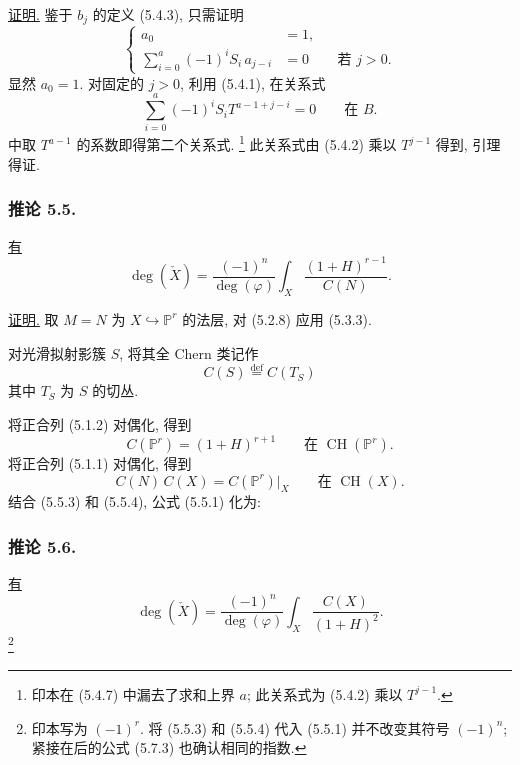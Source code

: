 \noindent\underline{证明.}
鉴于 $b_j$ 的定义 (5.4.3), 只需证明
\begin{equation}\tag{5.4.6}
\left\{
\begin{aligned}
a_0&=1,\\
\sum_{i=0}^{a}(-1)^iS_i\,a_{j-i}&=0
&&\text{若 }j>0.
\end{aligned}
\right.
\end{equation}
显然 $a_0=1$. 对固定的 $j>0$, 利用 (5.4.1), 在关系式
\begin{equation}\tag{5.4.7}
\sum_{i=0}^{a}(-1)^iS_iT^{a-1+j-i}=0
\qquad\text{在 }B.
\end{equation}
中取 $T^{a-1}$ 的系数即得第二个关系式.
\footnote{印本在 (5.4.7) 中漏去了求和上界 $a$; 此关系式为 (5.4.2) 乘以 $T^{j-1}$.}
此关系式由 (5.4.2) 乘以 $T^{j-1}$ 得到, 引理得证.

\subsubsection*{推论 5.5.}
\underline{有}
\begin{equation}\tag{5.5.1}
\deg(\check X)
=\frac{(-1)^n}{\deg(\varphi)}
\int_X\frac{(1+H)^{r-1}}{C(N)}.
\end{equation}

\noindent\underline{证明.}
取 $M=N$ 为 $X\hookrightarrow\mathbb P^r$ 的法层, 对 (5.2.8) 应用 (5.3.3).

对光滑拟射影簇 $S$, 将其全 Chern 类记作
\begin{equation}\tag{5.5.2}
C(S)\stackrel{\mathrm{def}}{=}C(T_S)
\end{equation}
其中 $T_S$ 为 $S$ 的切丛.

将正合列 (5.1.2) 对偶化, 得到
\begin{equation}\tag{5.5.3}
C(\mathbb P^r)=(1+H)^{r+1}
\qquad\text{在 }\operatorname{CH}(\mathbb P^r).
\end{equation}
将正合列 (5.1.1) 对偶化, 得到
\begin{equation}\tag{5.5.4}
C(N)\,C(X)=C(\mathbb P^r)|_X
\qquad\text{在 }\operatorname{CH}(X).
\end{equation}
结合 (5.5.3) 和 (5.5.4), 公式 (5.5.1) 化为:

\subsubsection*{推论 5.6.}
\underline{有}
\begin{equation}\tag{5.6.1}
\deg(\check X)
=\frac{(-1)^n}{\deg(\varphi)}
\int_X\frac{C(X)}{(1+H)^2}.
\end{equation}
\footnote{印本写为 $(-1)^r$. 将 (5.5.3) 和 (5.5.4) 代入 (5.5.1) 并不改变其符号 $(-1)^n$; 紧接在后的公式 (5.7.3) 也确认相同的指数.}

